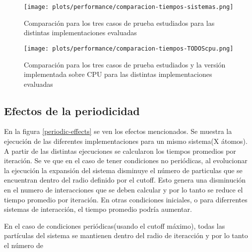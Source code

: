 \begin{figure}[htbp]
\centering
   \texttt{[image: plots/performance/comparacion-tiempos-sistemas.png]}
 \caption{Comparaci\'on para los tres casos de prueba estudiados para las distintas implementaciones evaluadas}
 \label{time-compare}
\end{figure}




\begin{figure}[htbp]
\centering
   \texttt{[image: plots/performance/comparacion-tiempos-TODOScpu.png]}
 \caption{Comparaci\'on para los tres casos de prueba estudiados y la versión implementada sobre CPU para las distintas implementaciones evaluadas}
 \label{time-compare-cpu}
\end{figure}

\subsection{Efectos de la periodicidad}


En la figura \ref{periodic-effects} se ven los efectos mencionados. Se muestra la ejecución de las diferentes implementaciones para un mismo sistema(X átomos). 
A partir de las distintas ejecuciones se calcularon los tiempos promedios por iteración. 
Se ve que en el caso de tener condiciones no periódicas, al evolucionar la ejecución la expansión del sistema disminuye el número de particulas que se encuentran dentro del radio definido por el cutoff.
Esto genera una disminución en el numero de interacciones que se deben calcular y por lo tanto se reduce el tiempo promedio por iteración. 
En otras condiciones iniciales, o para diferrentes sistemas de interacción, el tiempo promedio podría aumentar.

En el caso de condiciones periódicas(usando el cutoff máximo), todas las partículas del sistema se mantienen dentro del radio de iteracción y por lo tanto el número de 

